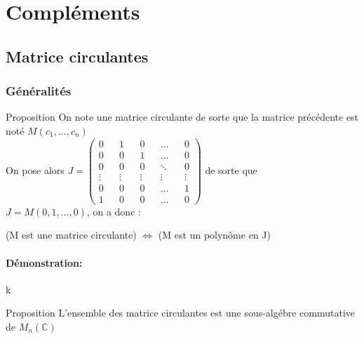 \documentclass{book}
\begin{document}
\section{Compléments}
\subsection{Matrice circulantes}
\subsubsection{Généralités}
\begin{Propriété}[]{Proposition}{}
On note une matrice circulante de sorte que la matrice précédente est noté \(M(c_1,...,c_n)\)
\\On pose alors \(J=\begin{pmatrix}
    0&&1&&0&&\dots&&0
    \\0&&0&&1&&\dots&&0
    \\0&&0&&0&&\ddots&&0
    \\ \vdots &&\vdots &&\vdots&& \vdots&&\vdots
    \\0&&0&&0&&\dots&&1
    \\1&&0&&0&&\dots&&0
\end{pmatrix}\)
de sorte que 
\\ \(J=M(0,1,...,0)\), on a donc : \\ \begin{center}(M est une matrice circulante) \(\Leftrightarrow\) (M est un polynôme en J)
\end{center}
\end{Propriété}
\paragraph{Démonstration:}
k
\begin{Propriété}[]{Proposition}{}
L'ensemble des matrice circulantes est une sous-algébre commutative de \(M_n(\mathbb{C})\)
\end{Propriété}
\end{document}
